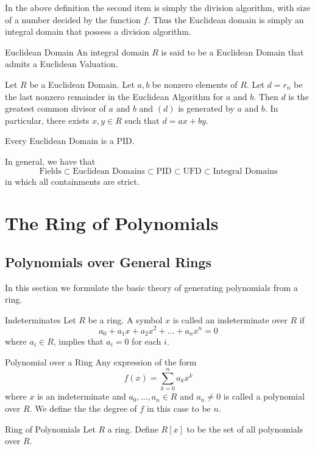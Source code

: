 \documentclass[a4paper]{article}
\begin{document}
In the above definition the second item is simply the division algorithm, with size of a number decided by the function $f$. Thus the Euclidean domain is simply an integral domain that possess a division algorithm. 

\begin{defn}{Euclidean Domain}{} An integral domain $R$ is said to be a Euclidean Domain that admits a Euclidean Valuation. 
\end{defn}

\begin{thm}{}{} Let $R$ be a Euclidean Domain. Let $a,b$ be nonzero elements of $R$. Let $d=r_n$ be the last nonzero remainder in the Euclidean Algorithm for $a$ and $b$. Then $d$ is the greatest common divisor of $a$ and $b$ and $(d)$ is generated by $a$ and $b$. In particular, there exists $x,y\in R$ such that $d=ax+by$. 
\end{thm}

\begin{prp}{}{} Every Euclidean Domain is a PID. 
\end{prp}

In general, we have that $$\text{Fields}\subset\text{Euclidean Domains}\subset\text{PID}\subset\text{UFD}\subset\text{Integral Domains}$$ in which all containments are strict. 

\pagebreak
\section{The Ring of Polynomials}
\subsection{Polynomials over General Rings}
In this section we formulate the basic theory of generating polynomials from a ring. 
\begin{defn}{Indeterminates}{} Let $R$ be a ring. A symbol $x$ is called an indeterminate over $R$ if $$a_0+a_1x+a_2x^2+\dots+a_nx^n=0$$ where $a_i\in R$, implies that $a_i=0$ for each $i$. 
\end{defn}

\begin{defn}{Polynomial over a Ring}{} Any expression of the form $$f(x)=\sum_{k=0}^na_kx^k$$ where $x$ is an indeterminate and $a_0,\dots,a_n\in R$ and $a_n\neq 0$ is called a polynomial over $R$. We define the the degree of $f$ in this case to be $n$. 
\end{defn}

\begin{defn}{Ring of Polynomials}{} Let $R$ a ring. Define $R[x]$ to be the set of all polynomials over $R$. 
\end{defn}
\end{document}
